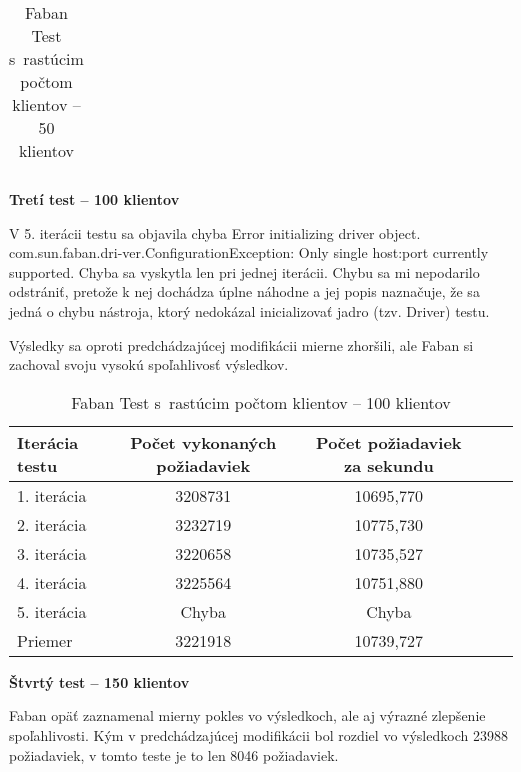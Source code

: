 \documentclass[12pt,oneside,final]{fithesis-utf8}
\begin{document}
\begin{itemize}
\begin{table}[H]
\begin{center}
\begin{tabular}{ | l | c | c | c | c |}
\end{tabular}
\end{center}
\caption{Faban Test s~rastúcim počtom klientov -- 50 klientov}
\end{table}


\textbf{Tretí test -- 100 klientov}

\hypertarget{label}{}
V 5. iterácii testu sa objavila chyba Error initializing driver object. com.sun.faban.dri-ver.ConfigurationException: Only single host:port currently supported. Chyba sa vyskytla len pri jednej iterácii. Chybu sa mi nepodarilo odstrániť, pretože k nej dochádza úplne náhodne a jej popis naznačuje, že sa jedná o chybu nástroja, ktorý nedokázal inicializovať jadro (tzv. Driver) testu.
\par Výsledky sa oproti predchádzajúcej modifikácii mierne zhoršili, ale Faban si zachoval svoju vysokú spoľahlivosť výsledkov.

\begin{table}[H]
\begin{center}
\begin{tabular}{ | l | c | c | c | c |}
		\hline
		 \textbf{Iterácia testu} & \textbf{Počet vykonaných požiadaviek} & \textbf{Počet požiadaviek za sekundu} \\ \hline
		 1. iterácia & 3208731 & 10695,770 \\ \hline
		 2. iterácia & 3232719 & 10775,730 \\ \hline
		 3. iterácia & 3220658 & 10735,527 \\ \hline
		 4. iterácia & 3225564 & 10751,880 \\ \hline
		 5. iterácia & Chyba & Chyba \\ \hline
		 Priemer & 3221918 & 10739,727 \\ \hline
		 
\end{tabular}
\end{center}
\caption{Faban Test s~rastúcim počtom klientov -- 100 klientov}
\end{table}


\textbf{Štvrtý test -- 150 klientov}

Faban opäť zaznamenal mierny pokles vo výsledkoch, ale aj výrazné zlepšenie spoľahlivosti. Kým v predchádzajúcej modifikácii bol rozdiel vo výsledkoch 23988 požiadaviek, v tomto teste je to len 8046 požiadaviek.


\end{itemize}
\end{document}

